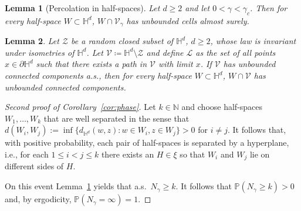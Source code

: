 \documentclass[10pt,a4paper]{amsart}
\newtheorem{lemma}{Lemma}
\renewcommand{\H}{\mathbb{H}}
\newcommand{\N}{\mathbb{N}}
\begin{document}
\begin{lemma}[Percolation in half-spaces] \label{lm:Localization} Let $d\ge2$ and let $0<\gamma<\gamma_c$. Then for every half-space $W\subset\mathbb H^d$, $W\cap \mathcal V_\gamma$ has unbounded cells almost surely. 
\end{lemma}

\begin{lemma}
Let \(\mathcal{Z}\) be a random closed subset of \(\H^d\), \(d \geq 2\), whose law is invariant under isometries of \(\H^d\).
Let \(\mathcal{V} \coloneqq \H^d \setminus \mathcal{Z}\) and define \(\mathcal{L}\) as the set of all points \(x \in \partial\H^d\) such that there exists a path in \(\mathcal{V}\) with limit \(x\).
If \(\mathcal{V}\) has unbounded connected components a.s., then for every half-space $W\subset\mathbb H^d$, $W\cap \mathcal V$ has unbounded connected components.
\end{lemma}

\begin{proof}[Second proof of Corollary~\ref{cor:phase}] Let $k\in\N$ and choose half-spaces \(W_1,\ldots,W_k\) that are well separated in the sense that $d(W_i,W_j):=\inf \{d_{\mathbb H^d}(w,z) : w\in  W_i, z\in W_j\} > 0$ for $i\neq j$.
It follows that, with positive probability, each pair of half-spaces is separated by a hyperplane, i.e., for each \(1 \leq i < j \leq k\) there exists an \(H \in \xi\) so that \(W_i\) and \(W_j\) lie on different sides of \(H\).

On this event Lemma~\ref{lm:Localization} yields that a.s.\ \(N_\gamma \geq k\).
It follows that \(\mathbb P(N_\gamma\ge k)>0\) and, by ergodicity, \(\mathbb P(N_\gamma = \infty) = 1\).
\end{proof}
\end{document}
